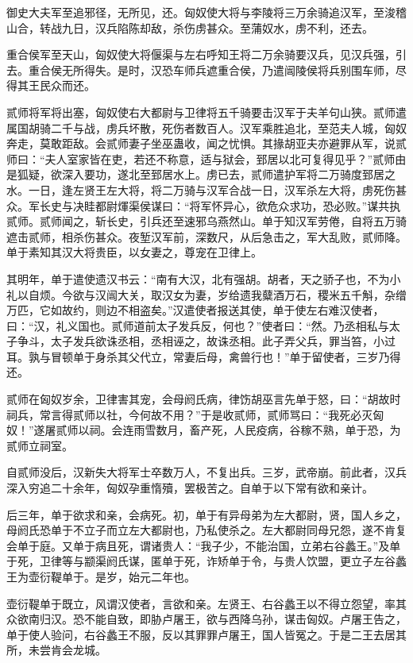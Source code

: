 \documentclass[]{article}
\begin{document}
御史大夫军至追邪径，无所见，还。匈奴使大将与李陵将三万余骑追汉军，至浚稽山合，转战九日，汉兵陷陈却敌，杀伤虏甚众。至蒲奴水，虏不利，还去。

重合侯军至天山，匈奴使大将偃渠与左右呼知王将二万余骑要汉兵，见汉兵强，引去。重合侯无所得失。是时，汉恐车师兵遮重合侯，乃遣闿陵侯将兵别围车师，尽得其王民众而还。

贰师将军将出塞，匈奴使右大都尉与卫律将五千骑要击汉军于夫羊句山狭。贰师遣属国胡骑二千与战，虏兵坏散，死伤者数百人。汉军乘胜追北，至范夫人城，匈奴奔走，莫敢距敌。会贰师妻子坐巫蛊收，闻之忧惧。其掾胡亚夫亦避罪从军，说贰师曰：``夫人室家皆在吏，若还不称意，适与狱会，郅居以北可复得见乎？''贰师由是狐疑，欲深入要功，遂北至郅居水上。虏已去，贰师遣护军将二万骑度郅居之水。一日，逢左贤王左大将，将二万骑与汉军合战一日，汉军杀左大将，虏死伤甚众。军长史与决眭都尉煇渠侯谋曰：``将军怀异心，欲危众求功，恐必败。''谋共执贰师。贰师闻之，斩长史，引兵还至速邪乌燕然山。单于知汉军劳倦，自将五万骑遮击贰师，相杀伤甚众。夜堑汉军前，深数尺，从后急击之，军大乱败，贰师降。单于素知其汉大将贵臣，以女妻之，尊宠在卫律上。

其明年，单于遣使遗汉书云：``南有大汉，北有强胡。胡者，天之骄子也，不为小礼以自烦。今欲与汉闿大关，取汉女为妻，岁给遗我糵酒万石，稷米五千斛，杂缯万匹，它如故约，则边不相盗矣。''汉遣使者报送其使，单于使左右难汉使者，曰：``汉，礼义国也。贰师道前太子发兵反，何也？''使者曰：``然。乃丞相私与太子争斗，太子发兵欲诛丞相，丞相诬之，故诛丞相。此子弄父兵，罪当笞，小过耳。孰与冒顿单于身杀其父代立，常妻后母，禽兽行也！''单于留使者，三岁乃得还。

贰师在匈奴岁余，卫律害其宠，会母阏氏病，律饬胡巫言先单于怒，曰：``胡故时祠兵，常言得贰师以社，今何故不用？''于是收贰师，贰师骂曰：``我死必灭匈奴！''遂屠贰师以祠。会连雨雪数月，畜产死，人民疫病，谷稼不熟，单于恐，为贰师立祠室。

自贰师没后，汉新失大将军士卒数万人，不复出兵。三岁，武帝崩。前此者，汉兵深入穷追二十余年，匈奴孕重惰殰，罢极苦之。自单于以下常有欲和亲计。

后三年，单于欲求和亲，会病死。初，单于有异母弟为左大都尉，贤，国人乡之，母阏氏恐单于不立子而立左大都尉也，乃私使杀之。左大都尉同母兄怨，遂不肯复会单于庭。又单于病且死，谓诸贵人：``我子少，不能治国，立弟右谷蠡王。''及单于死，卫律等与颛渠阏氏谋，匿单于死，诈矫单于令，与贵人饮盟，更立子左谷蠡王为壶衍鞮单于。是岁，始元二年也。

壶衍鞮单于既立，风谓汉使者，言欲和亲。左贤王、右谷蠡王以不得立怨望，率其众欲南归汉。恐不能自致，即胁卢屠王，欲与西降乌孙，谋击匈奴。卢屠王告之，单于使人验问，右谷蠡王不服，反以其罪罪卢屠王，国人皆冤之。于是二王去居其所，未尝肯会龙城。
\end{document}

